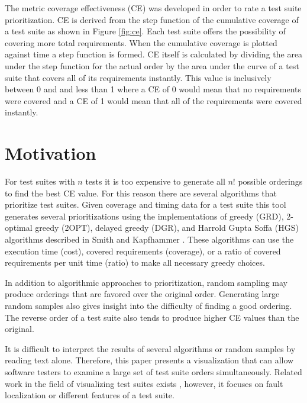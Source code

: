 \documentclass{vgtc}                          %
\begin{document}
The metric coverage effectiveness (CE) \cite{ce} was developed in order to rate a test suite prioritization.  CE is derived from the step function of the cumulative coverage of a test suite as shown in Figure \ref{fig:ce}.  Each test suite offers the possibility of covering more total requirements.  When the cumulative coverage is plotted against time a step function is formed.  CE itself is calculated by dividing the area under the step function for the actual order by the area under the curve of a test suite that covers all of its requirements instantly.  This value is inclusively between 0 and and less than 1 where a CE of 0 would mean that no requirements were covered and a CE of 1 would mean that all of the requirements were covered instantly.

\section{Motivation}

For test suites with $n$ tests it is too expensive to generate all $n!\!$ possible orderings to find the best CE value.  For this reason there are several algorithms that prioritize test suites.  Given coverage and timing data for a test suite this tool generates several prioritizations using the implementations of greedy (GRD), 2-optimal greedy (2OPT), delayed greedy (DGR), and Harrold Gupta Soffa (HGS) algorithms described in Smith and Kapfhammer \cite{smith:2009}.  These algorithms can use the execution time (cost), covered requirements (coverage), or a ratio of covered requirements per unit time (ratio) to make all necessary greedy choices.

In addition to algorithmic approaches to prioritization, random sampling may produce orderings that are favored over the original order.  Generating large random samples also gives insight into the difficulty of finding a good ordering.  The reverse order of a test suite also tends to produce higher CE values than the original. %

It is difficult to interpret the results of several algorithms or random samples by reading text alone.  Therefore, this paper presents a visualization that can allow software testers to examine a large set of test suite orders simultaneously.   Related work in the field of visualizing test suites exists \cite{tarantula}, however, it focuses on fault localization or different features of a test suite.
\end{document}

